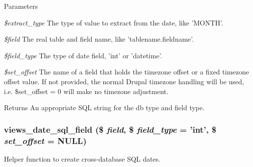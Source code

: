\begin{DoxyParams}{Parameters}
\item[{\em \$extract\_\-type}]The type of value to extract from the date, like 'MONTH'. \item[{\em \$field}]The real table and field name, like 'tablename.fieldname'. \item[{\em \$field\_\-type}]The type of date field, 'int' or 'datetime'. \item[{\em \$set\_\-offset}]The name of a field that holds the timezone offset or a fixed timezone offset value. If not provided, the normal Drupal timezone handling will be used, i.e. \$set\_\-offset = 0 will make no timezone adjustment. \end{DoxyParams}
\begin{DoxyReturn}{Returns}
An appropriate SQL string for the db type and field type. 
\end{DoxyReturn}
\hypertarget{handlers_8inc_ae61b1af2423ecd6df2332d716f980234}{
\subsubsection[{views\_\-date\_\-sql\_\-field}]{\setlength{\rightskip}{0pt plus 5cm}views\_\-date\_\-sql\_\-field (\$ {\em field}, \/  \$ {\em field\_\-type} = {\ttfamily 'int'}, \/  \$ {\em set\_\-offset} = {\ttfamily NULL})}}
\label{handlers_8inc_ae61b1af2423ecd6df2332d716f980234}
Helper function to create cross-\/database SQL dates.


